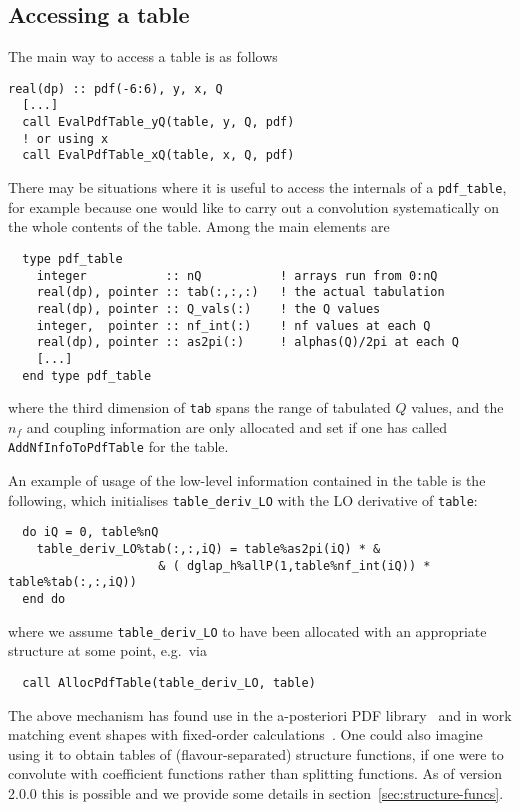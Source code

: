 \documentclass[12pt]{article}
\newcommand{\eg}{e.g.\ }
\newcommand{\ttt}[1]{\texttt{#1}}
\begin{document}
\subsection{Accessing a table}
\label{sec:acc_table}

The main way to access a table is as follows
\begin{lstlisting}
real(dp) :: pdf(-6:6), y, x, Q
  [...]
  call EvalPdfTable_yQ(table, y, Q, pdf)
  ! or using x
  call EvalPdfTable_xQ(table, x, Q, pdf)
\end{lstlisting}
There may be situations where it is useful to access the internals of
a \ttt{pdf\_table}, for example because one would like to carry out a
convolution systematically on the whole contents of the table. Among
the main elements are
\begin{lstlisting}
  type pdf_table
    integer           :: nQ           ! arrays run from 0:nQ
    real(dp), pointer :: tab(:,:,:)   ! the actual tabulation
    real(dp), pointer :: Q_vals(:)    ! the Q values 
    integer,  pointer :: nf_int(:)    ! nf values at each Q
    real(dp), pointer :: as2pi(:)     ! alphas(Q)/2pi at each Q
    [...]
  end type pdf_table
\end{lstlisting}
where the third dimension of \ttt{tab} spans the range of tabulated
$Q$ values, and the $n_f$ and coupling information are only allocated
and set if one has called \ttt{AddNfInfoToPdfTable} for the table.


An example of usage of the low-level information contained in the
table is the following, which initialises \ttt{table\_deriv\_LO} with
the LO derivative of \ttt{table}:
\begin{lstlisting}
  do iQ = 0, table%nQ
    table_deriv_LO%tab(:,:,iQ) = table%as2pi(iQ) * &
                     & ( dglap_h%allP(1,table%nf_int(iQ)) * table%tab(:,:,iQ))
  end do
\end{lstlisting}
where we assume \ttt{table\_deriv\_LO} to have been allocated with an
appropriate structure at some point, \eg via 
\begin{lstlisting}
  call AllocPdfTable(table_deriv_LO, table)
\end{lstlisting}
The above mechanism has found use in the a-posteriori PDF
library~\cite{Carli:2005ji,Carli:2010rw,Banfi:2007gu} 
and in work matching event shapes with fixed-order
calculations~\cite{caesar,Dasgupta:2001eq,Dasgupta:2002dc}.
%
One could also imagine using it to obtain tables of
(flavour-separated) structure functions, if one were to convolute with
coefficient functions rather than splitting functions. As of version
2.0.0 this is possible and we provide some details in
section~\ref{sec:structure-funcs}.
\end{document}
